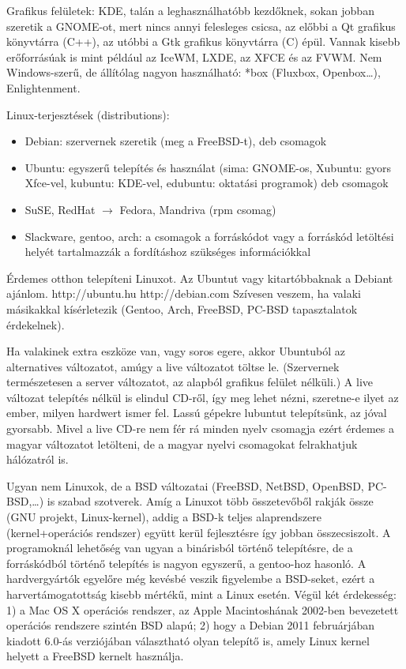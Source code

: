 \documentclass[a4paper]{article}
\begin{document}
Grafikus felületek: KDE, talán a leghasználhatóbb kezdőknek, sokan
jobban szeretik a GNOME-ot, mert nincs annyi felesleges csicsa, az
előbbi a Qt grafikus könyvtárra (C++), az utóbbi a Gtk grafikus
könyvtárra (C) épül. Vannak kisebb erőforrásúak is mint például az
IceWM, LXDE, az XFCE és az FVWM. Nem Windows-szerű, de állítólag nagyon
használható: *box (Fluxbox, Openbox\dots), Enlightenment.

Linux-terjesztések (distributions):
\begin{itemize}
\item Debian: szervernek szeretik (meg a FreeBSD-t), deb csomagok
\item Ubuntu: egyszerű telepítés és használat (sima: GNOME-os, Xubuntu:
	gyors Xfce-vel, kubuntu: KDE-vel, edubuntu: oktatási programok)
	deb csomagok
\item SuSE, RedHat $\rightarrow$ Fedora, Mandriva (rpm csomag)
\item Slackware, gentoo, arch: a csomagok a forráskódot vagy a forráskód
        letöltési helyét tartalmazzák a fordításhoz szükséges információkkal
\end{itemize}

Érdemes otthon telepíteni Linuxot. Az Ubuntut vagy kitartóbbaknak a
Debiant ajánlom.  http://ubuntu.hu http://debian.com Szívesen veszem, ha
valaki másikakkal kísérletezik (Gentoo, Arch, FreeBSD, PC-BSD
tapasztalatok érdekelnek).

Ha valakinek extra eszköze van, vagy soros egere, akkor Ubuntuból az
alternatives változatot, amúgy a live változatot töltse le. (Szervernek
természetesen a server változatot, az alapból grafikus felület nélküli.)
A live változat telepítés nélkül is elindul CD-ről, így meg lehet nézni,
szeretne-e ilyet az ember, milyen hardwert ismer fel. Lassú gépekre
lubuntut telepítsünk, az jóval gyorsabb. Mivel a live CD-re nem fér rá
minden nyelv csomagja ezért érdemes a magyar változatot letölteni, de
a magyar nyelvi csomagokat felrakhatjuk hálózatról is.

Ugyan nem Linuxok, de a BSD változatai (FreeBSD, NetBSD, OpenBSD,
PC-BSD,\ldots) is szabad szotverek. Amíg a Linuxot több összetevőből
rakják össze (GNU projekt, Linux-kernel), addig a BSD-k teljes alaprendszere
(kernel+operációs rendszer) együtt kerül fejlesztésre így jobban
összecsiszolt. A programoknál lehetőség van ugyan a binárisból történő
telepítésre, de a forráskódból történő telepítés is nagyon egyszerű, a
gentoo-hoz hasonló. A hardvergyártók egyelőre még kevésbé veszik
figyelembe a BSD-seket, ezért a harvertámogatottság kisebb mértékű, mint
a Linux esetén. Végül két érdekesség: 1) a Mac OS X operációs rendszer, az
Apple Macintoshának 2002-ben bevezetett operációs rendszere szintén
BSD alapú; 2) hogy a Debian 2011 februárjában kiadott 6.0-ás
verziójában választható olyan telepítő is, amely Linux kernel helyett a
FreeBSD kernelt használja.
\end{document}
